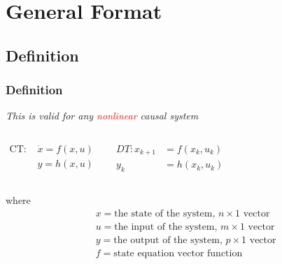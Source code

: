 

\section{General Format}
\subsection{Definition}
\begin{frame}
	\frametitle{Definition}
	\emph{This is valid for any \textcolor{red}{nonlinear} causal system}

	\begin{columns}
		\begin{align*}
		\text{CT: }&\dot{x}=f(x,u) \\
		&y=h(x,u)
		\end{align*}

		\begin{align*}
     	DT: x_{k+1}&=f(x_k,u_k)\\
     	y_k&=h(x_k,u_k)
		\end{align*}
	
	\end{columns}

\vspace{0.5cm}
where
\vspace{-0.5cm}
\begin{align*}
    &\mathit{x} = \text{the state of the system, } n\times1 \text{ vector}\\
    &\mathit{u} = \text{the input of the system, } m\times1\text{ vector}\\
    &\mathit{y} = \text{the output of the system, } p\times1 \text{ vector}\\
    &\mathit{f} = \text{state equation vector function}
\end{align*}

\end{frame}

